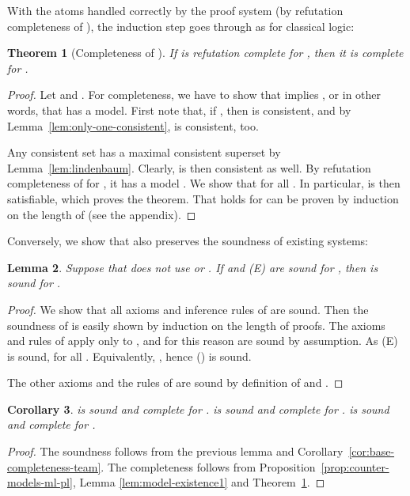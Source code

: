 \documentclass[a4paper,english,fleqn,11pt,final]{scrartcl}
\newcommand{\Deriv}[1]{{\normalfont\textsf{#1}}}
\theoremstyle{plain}
\newtheorem{theorem}{Theorem}[section]
\newtheorem{lemma}[theorem]{Lemma}
\newtheorem{corollary}[theorem]{Corollary}
\theoremstyle{definition}
\begin{document}
\medskip

With the atoms handled correctly by the proof system (by refutation completeness of ), the induction step goes through as for classical logic:

\begin{theorem}[Completeness of ]\label{thm:completeness-of-L}
If  is refutation complete for , then it is complete for .
\end{theorem}
\begin{proof}
Let  and .
For completeness, we have to show that  implies , or in other words, that  has a model.
First note that, if , then  is consistent, and by Lemma~\ref{lem:only-one-consistent},  is consistent, too.




Any consistent set  has a maximal consistent superset  by Lemma~\ref{lem:lindenbaum}.
Clearly,  is then consistent as well.
By refutation completeness of  for , it has a model .
We show that  for all .
In particular,  is then satisfiable, which proves the theorem.
That  holds for  can be proven by induction on the length of  (see the appendix).
\end{proof}

Conversely, we show that  also preserves the soundness of existing systems:

\begin{lemma}
Suppose that  does not use  or .
If  and \Deriv{(E)} are sound for , then  is sound for .
\end{lemma}
\begin{proof}
We show that all axioms and inference rules of  are sound.
Then the soundness of  is easily shown by induction on the length of proofs.
The axioms and rules of  apply only to , and for this reason are sound by assumption.
As \Deriv{(E)} is sound,  for all .
Equivalently, , hence \Deriv{()} is sound.

The other axioms and the rules of  are sound by definition of  and .
\end{proof}

\begin{corollary}\label{cor:completeness-bpl-bml}
	 is sound and complete for .
	 is sound and complete for .
	 is sound and complete for .
\end{corollary}
\begin{proof}
The soundness follows from the previous lemma and Corollary~\ref{cor:base-completeness-team}.
The completeness follows from Proposition~\ref{prop:counter-models-ml-pl}, Lemma \ref{lem:model-existence1} and Theorem~\ref{thm:completeness-of-L}.
\end{proof}
\end{document}
